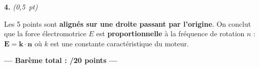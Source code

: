 \documentclass[11pt,a4paper]{article}
\newcommand{\reponse}[1]{%
  \begin{tcolorbox}[colback=green!5!white, colframe=green!50!black,
                    left=2mm, right=2mm, top=1mm, bottom=1mm]
  #1
  \end{tcolorbox}}
\begin{document}
\textbf{4.} \hfill \textit{(0,5~pt)}

\reponse{Les 5 points sont \textbf{alignés sur une droite passant par l'origine}. On conclut que la force électromotrice $E$ est \textbf{proportionnelle} à la fréquence de rotation $n$ : $\boldsymbol{E = k \cdot n}$ où $k$ est une constante caractéristique du moteur.}

\vfill

\begin{center}
  \large{\textbf{--- Barème total : /20 points ---}}
\end{center}
\end{document}
